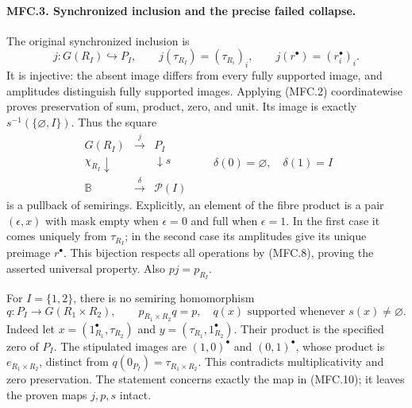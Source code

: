 \paragraph{MFC.3. Synchronized inclusion and the precise failed collapse.}
The original synchronized inclusion is
\[
 j:G(R_I)\hookrightarrow P_I,\qquad
 j(\tau_{R_I})=(\tau_{R_i})_i,\qquad
 j(r^\bullet)=(r_i^\bullet)_i.                             \tag{MFC.8}
\]
It is injective: the absent image differs from every fully supported
image, and amplitudes distinguish fully supported images. Applying
(MFC.2) coordinatewise proves preservation of sum, product, zero, and
unit. Its image is exactly \(s^{-1}(\{\varnothing,I\})\).
Thus the square
\[
 \begin{array}{ccc}
 G(R_I)&\xrightarrow{\ j\ }&P_I\\
 {\scriptstyle\chi_{R_I}}\downarrow&&\downarrow{\scriptstyle s}\\
 \mathbb B&\xrightarrow{\ \delta\ }&\mathcal P(I)
 \end{array}
 \qquad \delta(0)=\varnothing,\quad\delta(1)=I              \tag{MFC.9}
\]
is a pullback of semirings. Explicitly, an element of the fibre product
is a pair \((\epsilon,x)\) with mask empty when \(\epsilon=0\) and full
when \(\epsilon=1\). In the first case it comes uniquely from
\(\tau_{R_I}\); in the second case its amplitudes give its unique
preimage \(r^\bullet\). This bijection respects all operations by
(MFC.8), proving the asserted universal property. Also \(p j=p_{R_I}\).

For \(I=\{1,2\}\), there is no semiring homomorphism
\[
 q:P_I\longrightarrow G(R_1\times R_2),\qquad
 p_{R_1\times R_2}q=p,
 \quad q(x)\text{ supported whenever }s(x)\ne\varnothing.
                                                               \tag{MFC.10}
\]
Indeed let \(x=(1_{R_1}^\bullet,\tau_{R_2})\) and
\(y=(\tau_{R_1},1_{R_2}^\bullet)\). Their product is the specified zero
of \(P_I\). The stipulated images are \((1,0)^\bullet\) and
\((0,1)^\bullet\), whose product is \(e_{R_1\times R_2}\), distinct
from \(q(0_{P_I})=\tau_{R_1\times R_2}\). This contradicts
multiplicativity and zero preservation. The statement concerns exactly
the map in (MFC.10); it leaves the proven maps \(j,p,s\) intact.


